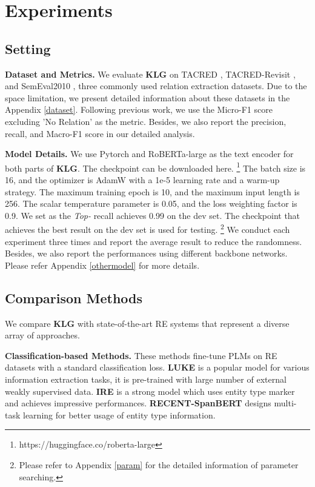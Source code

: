\section{Experiments}

\subsection{Setting}

\noindent\textbf{Dataset and Metrics.} We evaluate \textbf{KLG} on TACRED \cite{DBLP:conf/emnlp/ZhangZCAM17}, TACRED-Revisit \cite{DBLP:conf/acl/AltGH20a}, and SemEval2010 \cite{DBLP:conf/semeval/HendrickxKKNSPP10}, three commonly used relation extraction datasets. Due to the space limitation, we present detailed information about these datasets in the Appendix \ref{dataset}. Following previous work, we use the Micro-F1 score excluding 'No Relation' as the metric. Besides, we also report the precision, recall, and Macro-F1 score in our detailed analysis.



\noindent\textbf{Model Details.} We use Pytorch \cite{DBLP:conf/nips/PaszkeGMLBCKLGA19} and RoBERTa-large as the text encoder for both parts of \textbf{KLG}. The checkpoint can be downloaded here. \footnote{https://huggingface.co/roberta-large} The batch size is 16, and the optimizer is AdamW \cite{DBLP:conf/iclr/LoshchilovH19} with a 1e-5 learning rate and a warm-up strategy. The maximum training epoch is 10, and the maximum input length is 256. The scalar temperature parameter  is 0.05, and the loss weighting factor  is 0.9. We set  as the \textit{Top-} recall achieves 0.99 on the dev set. The checkpoint that achieves the best result on the dev set is used for testing. \footnote{Please refer to Appendix \ref{param} for the detailed information of parameter searching.} We conduct each experiment three times and report the average result to reduce the randomness. Besides, we also report the performances using different backbone networks. Please refer Appendix \ref{othermodel} for more details.

\subsection{Comparison Methods}\label{comparison}

We compare \textbf{KLG} with state-of-the-art RE systems that represent a diverse array of approaches. 

\textbf{Classification-based Methods.} These methods fine-tune PLMs on RE datasets with a standard classification loss. \textbf{LUKE} \cite{DBLP:conf/emnlp/YamadaASTM20} is a popular model for various information extraction tasks, it is pre-trained with large number of external weakly supervised data. \textbf{IRE} \cite{DBLP:journals/corr/abs-2102-01373} is a strong model which uses entity type marker and achieves impressive performances. \textbf{RECENT-SpanBERT} \cite{DBLP:conf/acl/LyuC21} designs multi-task learning for better usage of entity type information.
    

